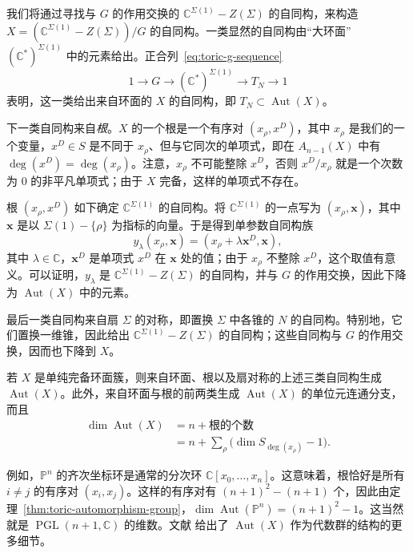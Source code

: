 我们将通过寻找与 $G$ 的作用交换的 $\mathbb C^{\Sigma(1)}-Z(\Sigma)$ 的自同构，来构造 $X=(\mathbb C^{\Sigma(1)}-Z(\Sigma))/G$ 的自同构。一类显然的自同构由“大环面” $(\mathbb C^*)^{\Sigma(1)}$ 中的元素给出。正合列~\eqref{eq:toric-g-sequence}
\[
1\longrightarrow G\longrightarrow(\mathbb C^*)^{\Sigma(1)}
\longrightarrow T_N\longrightarrow1
\]
表明，这一类给出来自环面的 $X$ 的自同构，即 $T_N\subset\operatorname{Aut}(X)$。

下一类自同构来自\emph{根}。$X$ 的一个根是一个有序对 $(x_\rho,x^D)$，其中 $x_\rho$ 是我们的一个变量，$x^D\in S$ 是不同于 $x_\rho$、但与它同次的单项式，即在 $A_{n-1}(X)$ 中有 $\deg(x^D)=\deg(x_\rho)$。注意，$x_\rho$ 不可能整除 $x^D$，否则 $x^D/x_\rho$ 就是一个次数为 $0$ 的非平凡单项式；由于 $X$ 完备，这样的单项式不存在。

根 $(x_\rho,x^D)$ 如下确定 $\mathbb C^{\Sigma(1)}$ 的自同构。将 $\mathbb C^{\Sigma(1)}$ 的一点写为 $(x_\rho,\mathbf x)$，其中 $\mathbf x$ 是以 $\Sigma(1)-\{\rho\}$ 为指标的向量。于是得到单参数自同构族
\begin{equation}\label{eq:toric-root-automorphism}
y_\lambda(x_\rho,\mathbf x)=
(x_\rho+\lambda\mathbf x^D,\mathbf x),
\end{equation}
其中 $\lambda\in\mathbb C$，$\mathbf x^D$ 是单项式 $x^D$ 在 $\mathbf x$ 处的值；由于 $x_\rho$ 不整除 $x^D$，这个取值有意义。可以证明，$y_\lambda$ 是 $\mathbb C^{\Sigma(1)}-Z(\Sigma)$ 的自同构，并与 $G$ 的作用交换，因此下降为 $\operatorname{Aut}(X)$ 中的元素。

最后一类自同构来自扇 $\Sigma$ 的对称，即置换 $\Sigma$ 中各锥的 $N$ 的自同构。特别地，它们置换一维锥，因此给出 $\mathbb C^{\Sigma(1)}-Z(\Sigma)$ 的自同构；这些自同构与 $G$ 的作用交换，因而也下降到 $X$。

\begin{theorem}\label{thm:toric-automorphism-group}
若 $X$ 是单纯完备环面簇，则来自环面、根以及扇对称的上述三类自同构生成 $\operatorname{Aut}(X)$。此外，来自环面与根的前两类生成 $\operatorname{Aut}(X)$ 的单位元连通分支，而且
\[
\begin{aligned}
\dim\operatorname{Aut}(X)
&=n+\text{根的个数}\\
&=n+\sum_\rho\bigl(\dim S_{\deg(x_\rho)}-1\bigr).
\end{aligned}
\]
\end{theorem}

例如，$\mathbb P^n$ 的齐次坐标环是通常的分次环 $\mathbb C[x_0,\ldots,x_n]$。这意味着，根恰好是所有 $i\ne j$ 的有序对 $(x_i,x_j)$。这样的有序对有 $(n+1)^2-(n+1)$ 个，因此由定理~\ref{thm:toric-automorphism-group}，$\dim\operatorname{Aut}(\mathbb P^n)=(n+1)^2-1$。这当然就是 $\operatorname{PGL}(n+1,\mathbb C)$ 的维数。文献  给出了 $\operatorname{Aut}(X)$ 作为代数群的结构的更多细节。

